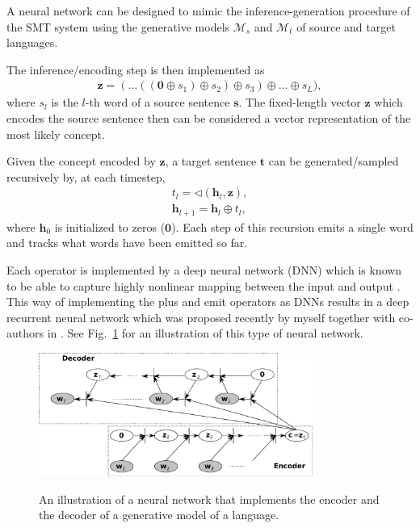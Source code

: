 \documentclass[11pt, oneside]{essay}
\newcommand{\vect}[1]{\mathbf{#1}}
\newcommand{\vh}[0]{\vect{h}}
\newcommand{\vs}[0]{\vect{s}}
\newcommand{\vt}[0]{\vect{t}}
\newcommand{\vz}[0]{\vect{z}}
\newcommand{\vzero}[0]{\vect{0}}
\begin{document}
A neural network can be designed to mimic the
inference-generation procedure of the SMT system using the
generative models $\mathcal{M}_s$ and $\mathcal{M}_t$ of source
and target languages. 

The inference/encoding step is then implemented as
\begin{align}
\label{eq:encoder}
\vz = (\dots ((\vzero \oplus s_1) \oplus s_2) \oplus s_3) \oplus \dots
\oplus s_L),
\end{align}
where $s_l$ is the $l$-th word of a source sentence $\vs$. The
fixed-length vector $\vz$ which encodes the source sentence then
can be considered a vector representation of the most likely
concept.

Given the concept encoded by $\vz$, a target sentence $\vt$ can
be generated/sampled recursively by, at each timestep,
\begin{align}
\label{eq:decoder}
t_l = \lhd \left(\vh_l, \vz\right), \nonumber\\
\vh_{l+1} = \vh_l \oplus t_l,
\end{align}
where $\vh_0$ is initialized to zeros ($\vzero$). Each step of
this recursion emits a single word and tracks what words have
been emitted so far.

Each operator is implemented by a deep neural network (DNN) which
is known to be able to capture highly nonlinear mapping between
the input and output \citep{Rumelhart1986}. This way of
implementing the plus and emit operators as DNNs results in a
deep recurrent neural network which was proposed recently by
myself together with co-authors in \citep{Pascanu2013}. See
Fig.~\ref{fig:autoencoder} for an illustration of this type of
neural network.


\begin{figure}[t]
\centering
\includegraphics[width=0.8\textwidth]{autoencoder.pdf}
\label{fig:autoencoder}
\caption{An illustration of a neural network that implements the
    encoder and the decoder of a generative model of a language.}
\end{figure}
\end{document}
